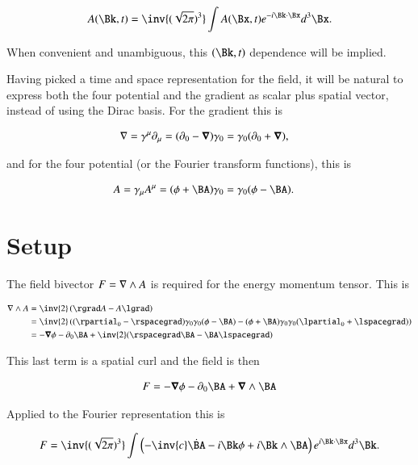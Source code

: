 \begin{align}
\label{eqn:ftMaxVacuum:3a}
A(\Bk, t) = \inv{(\sqrt{2 \pi})^3} \int A(\Bx, t) e^{-i \Bk \cdot \Bx } d^3 \Bx.
\end{align}

When convenient and unambiguous, this $(\Bk,t)$ dependence will be implied.

Having picked a time and space representation for the field, it will be natural to express both the four potential and the gradient as scalar plus spatial vector, instead of using the Dirac basis.  For the gradient this is

\begin{align}
\label{eqn:ftMaxVacuum:4}
\nabla &= \gamma^\mu \partial_\mu = (\partial_0 - \boldsymbol{\nabla}) \gamma_0 = \gamma_0 (\partial_0 + \boldsymbol{\nabla}),
\end{align}

and for the four potential (or the Fourier transform functions), this is

\begin{align}
\label{eqn:ftMaxVacuum:5}
A &= \gamma_\mu A^\mu = (\phi + \BA) \gamma_0 = \gamma_0 (\phi - \BA).
\end{align}

\section{Setup}

The field bivector $F = \nabla \wedge A$ is required for the energy momentum tensor.  This is

\begin{align*}
\grad \wedge A
&= \inv{2}\left( \rgrad A - A \lgrad \right) \\
&= \inv{2}\left( (\rpartial_0 - \rspacegrad) \gamma_0 \gamma_0 (\phi - \BA)
-
(\phi + \BA) \gamma_0 \gamma_0 (\lpartial_0 + \lspacegrad)
\right) \\
&= -\spacegrad \phi -\partial_0 \BA + \inv{2}(\rspacegrad \BA - \BA \lspacegrad)
\end{align*}

This last term is a spatial curl and the field is then

\begin{align}
\label{eqn:ftMaxVacuum:6}
F = -\spacegrad \phi -\partial_0 \BA + \spacegrad \wedge \BA
\end{align}

Applied to the Fourier representation this is

\begin{align}
\label{eqn:ftMaxVacuum:7}
F =
\inv{(\sqrt{2 \pi})^3} \int
\left(
- \inv{c} \dot{\BA}
- i \Bk \phi
+ i \Bk \wedge \BA
\right)
e^{i \Bk \cdot \Bx } d^3 \Bk.
\end{align}

